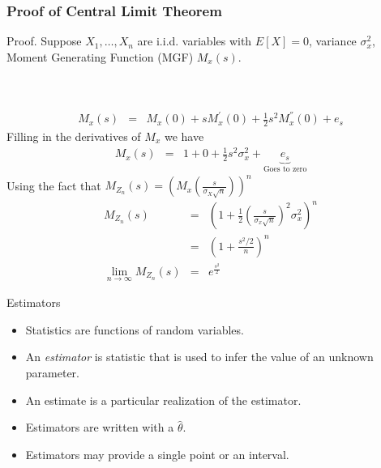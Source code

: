 \documentclass{beamer}
\numberwithin{equation}{section}
\begin{document}
\begin{frame}
\frametitle{Proof of Central Limit Theorem}

\large{Proof.}
Suppose $X_{1}, \hdots, X_{n}$ are i.i.d. variables with $E[X] = 0 $, variance $\sigma^{2}_{x}$, Moment Generating Function (MGF) $M_{x}(s)$. \pause  \\

 \pause \\
 \pause \\

\end{frame}


\begin{frame}
\begin{eqnarray}
M_{x} (s) & = & M_{x} (0)  + s M^{'}_{x}(0) + \frac{1}{2} s^2 M_{x}^{''}(0) + e_{s} \nonumber 
\end{eqnarray}
\pause
Filling  in the derivatives of $M_{x}$ we have 
\begin{eqnarray}
M_{x} (s) & = & 1  + 0 + \frac{1}{2} s^2\sigma_{x}^{2}  + \underbrace{e_{s}}_{\text{Goes to zero}} \nonumber 
\end{eqnarray}
\pause
Using the fact that $M_{Z_n}(s)=(M_x(\frac{s}{\sigma_X\sqrt{n}}))^n$
\pause
\begin{eqnarray}
M_{Z_{n}}(s) & = & \left(1 + \frac{1}{2}\left( \frac{s}{\sigma_{x} \sqrt{n}} \right)^{2}\sigma_{x}^{2} \right)^{n} \nonumber \\
& = & \left( 1 + \frac{s^{2}/2}{n} \right)^{n} \nonumber \\
\lim_{n\rightarrow \infty} M_{Z_{n}}(s) & = & e^{\frac{s^2}{2}}\nonumber 
\end{eqnarray}

\end{frame}

\begin{frame}{Estimators}
\begin{itemize}
\item Statistics are functions of random variables.  \pause
\item An \emph{estimator} is statistic that is used to infer the value of an unknown parameter.\pause
\item An estimate is a particular realization of the estimator.\pause
\item Estimators are written with a $\hat{\theta}$.\pause
\item Estimators may provide a single point or an interval.
\end{itemize}
\end{frame}
\end{document}
